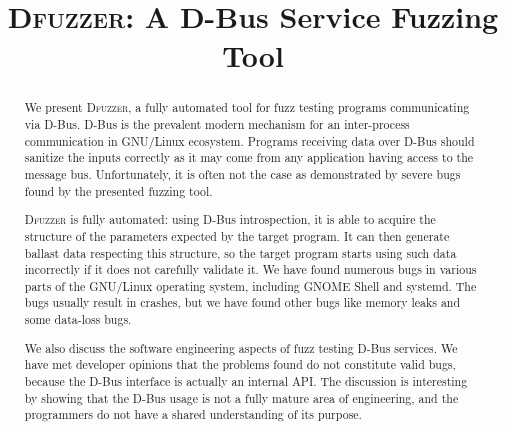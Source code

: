 \documentclass[conference]{IEEEtran}
\begin{document}
%
\title{\textbf{\textsc{Dfuzzer}: A D-Bus Service Fuzzing Tool}}

\author{
\vspace{5pt}
\vspace{5pt}
}


\maketitle


\begin{abstract}
We present \textsc{Dfuzzer}, a fully automated tool for fuzz testing
programs communicating via D-Bus. D-Bus is the prevalent modern mechanism for an
inter-process communication in GNU/Linux ecosystem. Programs receiving data over
D-Bus should sanitize the inputs correctly as it may come from any application
having access to the message bus. Unfortunately, it is often not the case as
demonstrated by severe bugs found by the presented fuzzing tool.

\textsc{Dfuzzer} is fully automated: using D-Bus introspection, it is able to
acquire the structure of the parameters expected by the target program. It can
then generate ballast data respecting this structure, so the target program
starts using such data incorrectly if it does not carefully validate it.
We have found numerous bugs in various parts of the GNU/Linux operating system,
including GNOME Shell and systemd. The bugs usually result in crashes, but we
have found other bugs like memory leaks and some data-loss bugs.

We also discuss the software engineering aspects of fuzz testing D-Bus services.
We have met developer opinions that the problems found do not constitute valid bugs, because the D-Bus interface is
actually an internal API. The discussion is interesting by showing that the
D-Bus usage is not a fully mature area of engineering, and the programmers do
not have a shared understanding of its purpose.
\end{abstract}
\end{document}
